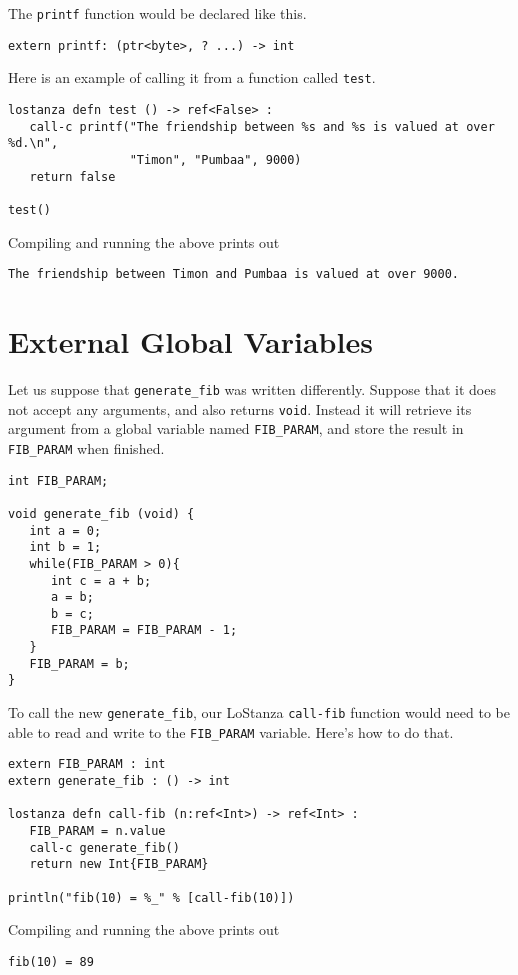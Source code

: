 \documentclass[10pt,oneside]{book}
\begin{document}
The \texttt{\frenchspacing printf} function would be declared like this.
\begin{lstlisting}
extern printf: (ptr<byte>, ? ...) -> int
\end{lstlisting}

Here is an example of calling it from a function called \texttt{\frenchspacing test}.
\begin{lstlisting}
lostanza defn test () -> ref<False> :
   call-c printf("The friendship between %s and %s is valued at over %d.\n",
                 "Timon", "Pumbaa", 9000)
   return false

test()
\end{lstlisting}

Compiling and running the above prints out
\begin{lstlisting}
The friendship between Timon and Pumbaa is valued at over 9000.
\end{lstlisting}

\section{External Global Variables}
Let us suppose that \texttt{\frenchspacing generate\_fib} was written differently. Suppose that it does not accept any arguments, and also returns \texttt{\frenchspacing void}. Instead it will retrieve its argument from a global variable named \texttt{\frenchspacing FIB\_PARAM}, and store the result in \texttt{\frenchspacing FIB\_PARAM} when finished. 

\begin{lstlisting}
int FIB_PARAM;

void generate_fib (void) {
   int a = 0;
   int b = 1;
   while(FIB_PARAM > 0){
      int c = a + b;
      a = b;
      b = c;
      FIB_PARAM = FIB_PARAM - 1;
   }
   FIB_PARAM = b;
}
\end{lstlisting}

To call the new \texttt{\frenchspacing generate\_fib}, our LoStanza \texttt{\frenchspacing call-fib} function would need to be able to read and write to the \texttt{\frenchspacing FIB\_PARAM} variable. Here's how to do that.
\begin{lstlisting}
extern FIB_PARAM : int
extern generate_fib : () -> int

lostanza defn call-fib (n:ref<Int>) -> ref<Int> :
   FIB_PARAM = n.value
   call-c generate_fib()
   return new Int{FIB_PARAM}

println("fib(10) = %_" % [call-fib(10)])
\end{lstlisting}
Compiling and running the above prints out
\begin{lstlisting}
fib(10) = 89
\end{lstlisting}
\end{document}

